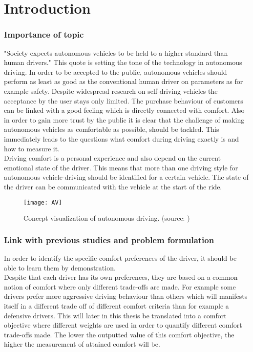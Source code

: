 \chapter{Introduction}
\label{cha:intro}
\subsection{Importance of topic}
"Society expects autonomous vehicles to be held to a higher standard than human drivers." \cite{Prof.Amnon} This quote is setting the tone of the technology in autonomous driving. In order to be accepted to the public, autonomous vehicles should perform as least as good as the conventional human driver on parameters as for example safety. Despite widespread research on self-driving vehicles the acceptance by the user stays only limited.\cite{Bae2019} The purchase behaviour of customers can be linked with a good feeling which is directly connected with comfort. Also in order to gain more trust by the public it is clear that the challenge of making autonomous vehicles as comfortable as possible, should be tackled. This immediately leads to the questions what comfort during driving exactly is and how to measure it.\\
Driving comfort is a personal experience and also depend on the current emotional state of the driver. This means that more than one driving style for autonomous vehicle-driving should be identified for a certain vehicle. \cite{Eindhoven2019} The state of the driver can be communicated with the vehicle at the start of the ride. 

\begin{figure}[h!]
	\centering
	\texttt{[image: AV]}
	\caption{Concept visualization of autonomous driving. (source: \cite{AV})}
	\label{fig:AV}
\end{figure} 

\subsection{Link with previous studies and problem formulation}

In order to identify the specific comfort preferences of the driver, it should be able to learn them by demonstration. \cite{Kuderer2015a}\\
Despite that each driver has its own preferences, they are based on a common notion of comfort where only different trade-offs are made. For example some drivers prefer more aggressive driving behaviour than others which will manifests itself in a different trade off of different comfort criteria than for example a defensive drivers. This will later in this thesis be translated into a comfort objective where different weights are used in order to quantify different comfort trade-offs made. The lower the outputted value of this comfort objective, the higher the measurement of attained comfort will be.\\

